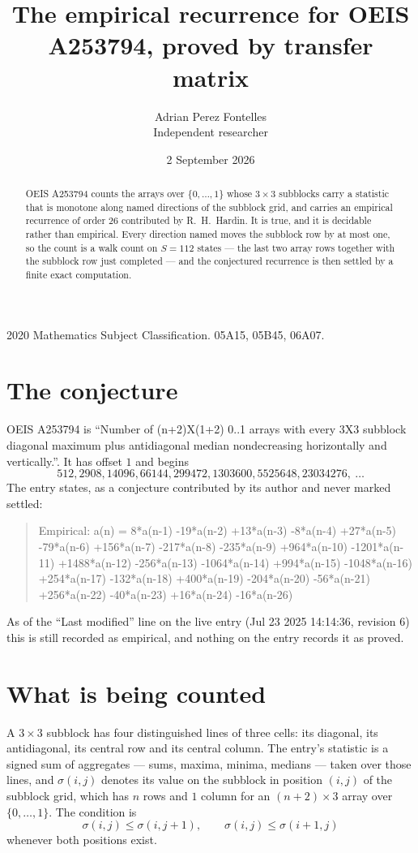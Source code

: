 \documentclass[11pt,a4paper]{article}
\title{The empirical recurrence for OEIS A253794, proved by transfer matrix}
\author{Adrian Perez Fontelles\\ \small Independent researcher}
\date{2 September 2026}
\theoremstyle{plain}
\theoremstyle{definition}
\begin{document}
\maketitle

\begin{abstract}
OEIS A253794 counts the arrays over $\{0,\dots,1\}$ whose $3\times3$ subblocks carry a
statistic that is monotone along named directions of the subblock grid, and carries an
empirical recurrence of order $26$ contributed by R.~H.~Hardin. It is true, and it is
decidable rather than empirical. Every direction named moves the subblock row by at most one,
so the count is a walk count on $S=112$ states --- the last two array rows together with the
subblock row just completed --- and the conjectured recurrence is then settled by a finite
exact computation.
\end{abstract}

\noindent\small 2020 Mathematics Subject Classification. 05A15, 05B45, 06A07.\normalsize

\section{The conjecture}

OEIS A253794 is ``Number of (n+2)X(1+2) 0..1 arrays with every 3X3 subblock diagonal maximum plus antidiagonal median nondecreasing horizontally and vertically.''. It has offset $1$ and begins
\[
512, 2908, 14096, 66144, 299472, 1303600, 5525648, 23034276,\ \dots
\]
The entry states, as a conjecture contributed by its author and never marked settled:
\begin{quote}
Empirical: a(n) = 8*a(n-1) -19*a(n-2) +13*a(n-3) -8*a(n-4) +27*a(n-5) -79*a(n-6) +156*a(n-7) -217*a(n-8) -235*a(n-9) +964*a(n-10) -1201*a(n-11) +1488*a(n-12) -256*a(n-13) -1064*a(n-14) +994*a(n-15) -1048*a(n-16) +254*a(n-17) -132*a(n-18) +400*a(n-19) -204*a(n-20) -56*a(n-21) +256*a(n-22) -40*a(n-23) +16*a(n-24) -16*a(n-26)
\end{quote}
As of the ``Last modified'' line on the live entry (Jul 23 2025 14:14:36, revision 6) this is still
recorded as empirical, and nothing on the entry records it as proved.

\section{What is being counted}

A $3\times3$ subblock has four distinguished lines of three cells: its diagonal, its
antidiagonal, its central row and its central column. The entry's statistic is a signed sum of
aggregates --- sums, maxima, minima, medians --- taken over those lines, and $\sigma(i,j)$
denotes its value on the subblock in position $(i,j)$ of the subblock grid, which has $n$ rows
and $1$ column for an $(n+2)\times3$ array over $\{0,\dots,1\}$. The condition is
\[
\sigma(i,j)\le\sigma(i,j+1),\qquad \sigma(i,j)\le\sigma(i+1,j)
\]
whenever both positions exist.
\end{document}
